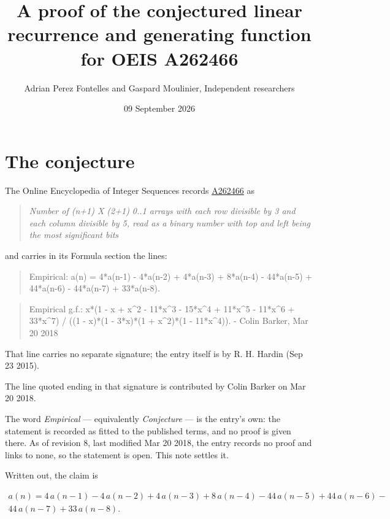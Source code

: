 \documentclass[11pt]{article}
\title{A proof of the conjectured linear recurrence and generating function for OEIS A262466}
\author{Adrian Perez Fontelles and Gaspard Moulinier, Independent researchers}
\date{09 September 2026}
\theoremstyle{definition}
\begin{document}
\maketitle
\section{The conjecture}

The Online Encyclopedia of Integer Sequences records \href{https://oeis.org/A262466}{A262466} as

\begin{quote}\itshape Number of (n+1) X (2+1) 0..1 arrays with each row divisible by 3 and each column divisible by 5, read as a binary number with top and left being the most significant bits\end{quote}

and carries in its Formula section the lines:

\begin{quote}\ttfamily Empirical: a(n) = 4*a(n-1) - 4*a(n-2) + 4*a(n-3) + 8*a(n-4) - 44*a(n-5) + 44*a(n-6) - 44*a(n-7) + 33*a(n-8).\end{quote}

\begin{quote}\ttfamily Empirical g.f.: x*(1 - x + x\textasciicircum{}2 - 11*x\textasciicircum{}3 - 15*x\textasciicircum{}4 + 11*x\textasciicircum{}5 - 11*x\textasciicircum{}6 + 33*x\textasciicircum{}7) / ((1 - x)*(1 - 3*x)*(1 + x\textasciicircum{}2)*(1 - 11*x\textasciicircum{}4)). - Colin Barker, Mar 20 2018\end{quote}

That line carries no separate signature; the entry itself is by R. H. Hardin (Sep 23 2015).

The line quoted ending in that signature is contributed by Colin Barker on Mar 20 2018.

The word {\itshape Empirical} --- equivalently {\itshape Conjecture} --- is the entry's own: the statement is recorded as fitted to the published terms, and no proof is given there. As of revision 8, last modified Mar 20 2018, the entry records no proof and links to none, so the statement is open. This note settles it.

Written out, the claim is

\begin{multline*} a(n) = 4\,a(n-1) - 4\,a(n-2) + 4\,a(n-3) + 8\,a(n-4) - 44\,a(n-5) + 44\,a(n-6) - \\ 44\,a(n-7) + 33\,a(n-8). \end{multline*}
\end{document}
